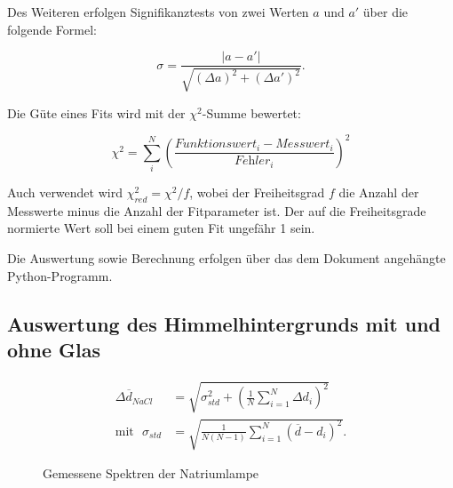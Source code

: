 \documentclass{article}
\begin{document}
Des Weiteren erfolgen Signifikanztests von zwei Werten $a$ und $a'$ über die folgende Formel:

\begin{equation}
    \sigma = \frac{|a-a'|}{\sqrt{(\Delta a)^2 + (\Delta a')^2}}.
\end{equation}

Die Güte eines Fits wird mit der $\chi^2$-Summe bewertet:

\begin{equation}
    \chi^2 = \sum_i^N \left( \frac{\textit{Funktionswert}_i - \textit{Messwert}_i}{\textit{Fehler}_i} \right)^2
\end{equation}

Auch verwendet wird $\chi^2_{red} = \chi^2 / f$, wobei der Freiheitsgrad $f$ die Anzahl der Messwerte minus die Anzahl der Fitparameter ist. Der auf die Freiheitsgrade normierte Wert soll bei einem guten Fit ungefähr 1 sein.

Die Auswertung sowie Berechnung erfolgen über das dem Dokument angehängte Python-Programm.

\newpage

\subsection{Auswertung des Himmelhintergrunds mit und ohne Glas}

\begin{equation}
    \begin{split}
        \Delta \overline{d}_{NaCl} &= \sqrt{\sigma_{std}^2 + \left( \frac{1}{N} \sum_{i=1}^N \Delta d_i \right)^2} \\
        \text{mit} \ \ \ \sigma_{std} &= \sqrt{\frac{1}{N(N-1)} \sum_{i=1}^N (\overline{d} - d_i)^2}.
    \end{split}
\end{equation}


\begin{figure}[h]
  \centering
  \hfill
  \hfill
  \hfill
  \hfill
  \caption{Gemessene Spektren der Natriumlampe}
  \label{fig:alleNatriumspektren}
\end{figure}
\end{document}
